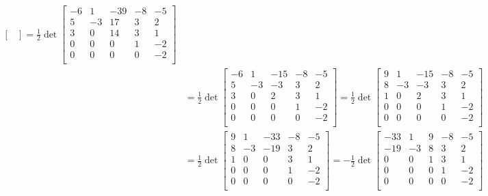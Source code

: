 \documentclass{article}
\begin{document}
\[\begin{aligned}
{\begin{bmatrix}
    \end{bmatrix}} = \frac{1}{2}\det{\begin{bmatrix}
        -6 &  1 & -39 & -8 & -5 \\
         5 & -3 &  17 &  3 &  2 \\
         3 &  0 &  14 &  3 &  1 \\
         0 &  0 &   0 &  1 & -2 \\
         0 &  0 &   0 &  0 & -2 \\
    \end{bmatrix}} \\ &= \frac{1}{2}\det{\begin{bmatrix}
        -6 &  1 & -15 & -8 & -5 \\
         5 & -3 &  -3 &  3 &  2 \\
         3 &  0 &   2 &  3 &  1 \\
         0 &  0 &   0 &  1 & -2 \\
         0 &  0 &   0 &  0 & -2 \\
    \end{bmatrix}} = \frac{1}{2}\det{\begin{bmatrix}
        9 &  1 & -15 & -8 & -5 \\
        8 & -3 &  -3 &  3 &  2 \\
        1 &  0 &   2 &  3 &  1 \\
        0 &  0 &   0 &  1 & -2 \\
        0 &  0 &   0 &  0 & -2 \\
    \end{bmatrix}} \\ &= \frac{1}{2}\det{\begin{bmatrix}
        9 &  1 & -33 & -8 & -5 \\
        8 & -3 & -19 &  3 &  2 \\
        1 &  0 &   0 &  3 &  1 \\
        0 &  0 &   0 &  1 & -2 \\
        0 &  0 &   0 &  0 & -2 \\
    \end{bmatrix}} = - \frac{1}{2}\det{\begin{bmatrix}
        -33 &  1 & 9 & -8 & -5 \\
        -19 & -3 & 8 &  3 &  2 \\
          0 &  0 & 1 &  3 &  1 \\
          0 &  0 & 0 &  1 & -2 \\
          0 &  0 & 0 &  0 & -2 \\

\end{bmatrix}}
\end{aligned}\]
\end{document}
